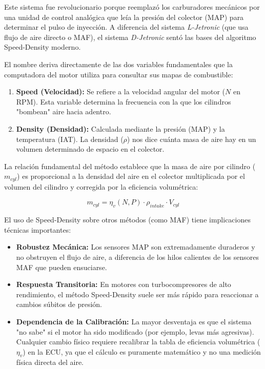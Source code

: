 Este sistema fue revolucionario porque reemplazó los carburadores mecánicos por una unidad de control analógica que leía la presión del colector (MAP) para determinar el pulso de inyección. A diferencia del sistema \textit{L-Jetronic} (que usa flujo de aire directo o MAF), el sistema \textit{D-Jetronic} sentó las bases del algoritmo Speed-Density moderno.

El nombre deriva directamente de las dos variables fundamentales que la computadora del motor utiliza para consultar sus mapas de combustible:

\begin{enumerate}
	\item \textbf{Speed (Velocidad):} Se refiere a la velocidad angular del motor ($N$ en RPM). Esta variable determina la frecuencia con la que los cilindros "bombean" aire hacia adentro.
	\item \textbf{Density (Densidad):} Calculada mediante la presión (MAP) y la temperatura (IAT). La densidad ($\rho$) nos dice cuánta masa de aire hay en un volumen determinado de espacio en el colector.
\end{enumerate}

La relación fundamental del método establece que la masa de aire por cilindro ($m_{cyl}$) es proporcional a la densidad del aire en el colector multiplicada por el volumen del cilindro y corregida por la eficiencia volumétrica:

\begin{equation}
	m_{cyl} = \eta_v(N, P) \cdot \rho_{intake} \cdot V_{cyl}
\end{equation}


El uso de Speed-Density sobre otros métodos (como MAF) tiene implicaciones técnicas importantes:

\begin{itemize}
	\item \textbf{Robustez Mecánica:} Los sensores MAP son extremadamente duraderos y no obstruyen el flujo de aire, a diferencia de los hilos calientes de los sensores MAF que pueden ensuciarse.
	\item \textbf{Respuesta Transitoria:} En motores con turbocompresores de alto rendimiento, el método Speed-Density suele ser más rápido para reaccionar a cambios súbitos de presión.
	\item \textbf{Dependencia de la Calibración:} La mayor desventaja es que el sistema "no sabe" si el motor ha sido modificado (por ejemplo, levas más agresivas). Cualquier cambio físico requiere recalibrar la tabla de eficiencia volumétrica ($\eta_v$) en la ECU, ya que el cálculo es puramente matemático y no una medición física directa del aire.
\end{itemize}



